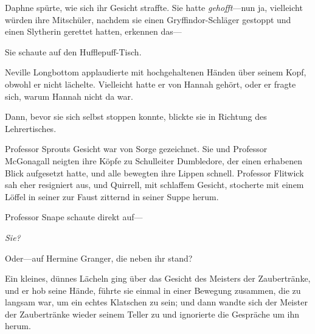 Daphne spürte, wie sich ihr Gesicht straffte. Sie hatte \emph{gehofft}—nun ja, vielleicht würden ihre Mitschüler, nachdem sie einen Gryffindor-Schläger gestoppt und einen Slytherin gerettet hatten, erkennen das—

Sie schaute auf den Hufflepuff-Tisch.

Neville Longbottom applaudierte mit hochgehaltenen Händen über seinem Kopf, obwohl er nicht lächelte. Vielleicht hatte er von Hannah gehört, oder er fragte sich, warum Hannah nicht da war.

Dann, bevor sie sich selbst stoppen konnte, blickte sie in Richtung des Lehrertisches.

Professor Sprouts Gesicht war von Sorge gezeichnet. Sie und Professor McGonagall neigten ihre Köpfe zu Schulleiter Dumbledore, der einen erhabenen Blick aufgesetzt hatte, und alle bewegten ihre Lippen schnell. Professor Flitwick sah eher resigniert aus, und Quirrell, mit schlaffem Gesicht, stocherte mit einem Löffel in seiner zur Faust zitternd in seiner Suppe herum.

Professor Snape schaute direkt auf—

\emph{Sie?}

Oder—auf Hermine Granger, die neben ihr stand?

Ein kleines, dünnes Lächeln ging über das Gesicht des Meisters der Zaubertränke, und er hob seine Hände, führte sie einmal in einer Bewegung zusammen, die zu langsam war, um ein echtes Klatschen zu sein; und dann wandte sich der Meister der Zaubertränke wieder seinem Teller zu und ignorierte die Gespräche um ihn herum.

